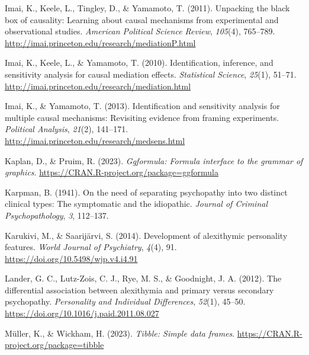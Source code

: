 \documentclass[
  man,floatsintext]{apa7}
\newlength{\cslhangindent}
\newlength{\cslentryspacingunit} %
\newenvironment{CSLReferences}[2] %
 {%
  \setlength{\parindent}{0pt}
  \ifodd #1
  \let\oldpar\par
  \def\par{\hangindent=\cslhangindent\oldpar}
  \fi
  \setlength{\parskip}{#2\cslentryspacingunit}
 }%
 {}
\begin{document}
\begin{CSLReferences}{1}{0}
\leavevmode{}%
Imai, K., Keele, L., Tingley, D., \& Yamamoto, T. (2011). Unpacking the black box of causality: Learning about causal mechanisms from experimental and observational studies. \emph{American Political Science Review}, \emph{105}(4), 765--789. \url{http://imai.princeton.edu/research/mediationP.html}

\leavevmode{}%
Imai, K., Keele, L., \& Yamamoto, T. (2010). Identification, inference, and sensitivity analysis for causal mediation effects. \emph{Statistical Science}, \emph{25}(1), 51--71. \url{http://imai.princeton.edu/research/mediation.html}

\leavevmode{}%
Imai, K., \& Yamamoto, T. (2013). Identification and sensitivity analysis for multiple causal mechanisms: Revisiting evidence from framing experiments. \emph{Political Analysis}, \emph{21}(2), 141--171. \url{http://imai.princeton.edu/research/medsens.html}

\leavevmode{}%
Kaplan, D., \& Pruim, R. (2023). \emph{Ggformula: Formula interface to the grammar of graphics}. \url{https://CRAN.R-project.org/package=ggformula}

\leavevmode{}%
Karpman, B. (1941). On the need of separating psychopathy into two distinct clinical types: The symptomatic and the idiopathic. \emph{Journal of Criminal Psychopathology}, \emph{3}, 112--137.

\leavevmode{}%
Karukivi, M., \& Saarijärvi, S. (2014). Development of alexithymic personality features. \emph{World Journal of Psychiatry}, \emph{4}(4), 91. \url{https://doi.org/10.5498/wjp.v4.i4.91}

\leavevmode{}%
Lander, G. C., Lutz-Zois, C. J., Rye, M. S., \& Goodnight, J. A. (2012). The differential association between alexithymia and primary versus secondary psychopathy. \emph{Personality and Individual Differences}, \emph{52}(1), 45--50. \url{https://doi.org/10.1016/j.paid.2011.08.027}

\leavevmode{}%
Müller, K., \& Wickham, H. (2023). \emph{Tibble: Simple data frames}. \url{https://CRAN.R-project.org/package=tibble}


\end{CSLReferences}
\end{document}

